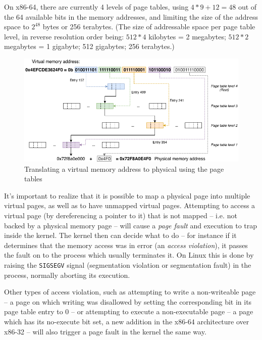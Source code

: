 On x86-64, there are currently 4 levels of page tables, using $4 * 9 + 12 = 48$ out of the 64 available bits in the memory addresses, and limiting the size of the address space to $2^{48}$ bytes or 256 terabytes. (The size of addressable space per page table level, in reverse resolution order being: $512 * 4$ kilobytes = 2 megabytes; $512 * 2$ megabytes = 1 gigabyte; 512 gigabytes; 256 terabytes.)

\begin{figure}
	\centering
	\includegraphics[width=\textwidth]{diagrams/page_table_tree.png}
	\caption{Translating a virtual memory address to physical using the page tables}
	\label{fig:page_table_tree}
\end{figure}

It's important to realize that it is possible to map a physical page into multiple virtual pages, as well as to have unmapped virtual pages. Attempting to access a virtual page (by dereferencing a pointer to it) that is not mapped -- i.e. not backed by a physical memory page -- will cause a \emph{page fault} and execution to trap inside the kernel. The kernel then can decide what to do -- for instance if it determines that the memory access was in error (an \emph{access violation}), it passes the fault on to the process which usually terminates it. On Linux this is done by raising the \texttt{SIGSEGV} signal (segmentation violation or segmentation fault) in the process, normally aborting its execution.

Other types of access violation, such as attempting to write a non-writeable page -- a page on which writing was disallowed by setting the corresponding bit in its page table entry to 0 -- or attempting to execute a non-executable page -- a page which has its no-execute bit set, a new addition in the x86-64 architecture over x86-32 -- will also trigger a page fault in the kernel the same way.

